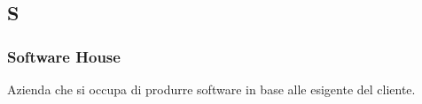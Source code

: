 \subsection*{\textbf{\hfill \Huge{S} \hfill}} 
\subsubsection*{Software House}
Azienda che si occupa di produrre software in base alle esigente del cliente.
